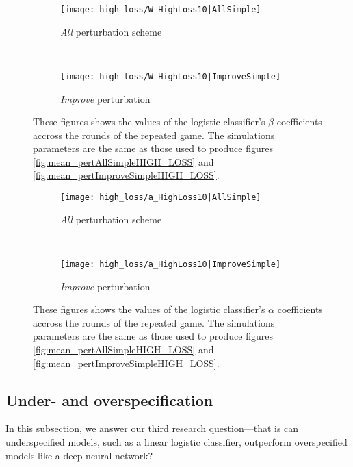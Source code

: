 \documentclass[12pt]{article} %
\begin{document}
\begin{figure*}[t!]
    \centering
    \begin{subfigure}{0.5\textwidth}
        \centering
        \texttt{[image: high\_loss/W\_HighLoss10|AllSimple]}
        \caption{\textit{All} perturbation scheme}
        \label{fig:high_loss_beta_ALL}
    \end{subfigure}%
    ~ 
    \begin{subfigure}{0.5\textwidth}
        \centering
        \texttt{[image: high\_loss/W\_HighLoss10|ImproveSimple]}
            \caption{\textit{Improve} perturbation}
        \label{fig:high_loss_beta_IMPROVE}
    \end{subfigure}
    \caption{These figures shows the values of the logistic classifier's $\beta$ coefficients accross the rounds of the repeated game. The simulations parameters are the same as those used to produce figures \ref{fig:mean_pertAllSimpleHIGH_LOSS} and \ref{fig:mean_pertImproveSimpleHIGH_LOSS}.}
\end{figure*}

\begin{figure*}[t!]
    \centering
    \begin{subfigure}{0.5\textwidth}
        \centering
        \texttt{[image: high\_loss/a\_HighLoss10|AllSimple]}
        \caption{\textit{All} perturbation scheme}
        \label{fig:high_loss_alpha_ALL}
    \end{subfigure}%
    ~ 
    \begin{subfigure}{0.5\textwidth}
        \centering
        \texttt{[image: high\_loss/a\_HighLoss10|ImproveSimple]}
            \caption{\textit{Improve} perturbation}
        \label{fig:high_loss_alpha_IMPROVE}
    \end{subfigure}
    \caption{These figures shows the values of the logistic classifier's $\alpha$ coefficients accross the rounds of the repeated game. The simulations parameters are the same as those used to produce figures \ref{fig:mean_pertAllSimpleHIGH_LOSS} and \ref{fig:mean_pertImproveSimpleHIGH_LOSS}.}
\end{figure*}




\subsection{Under- and overspecification}
\label{sec:over_under_specification}
In this subsection, we answer our third research question---that is can underspecified models, such as a linear logistic classifier, outperform overspecified models like a deep neural network? 
\end{document}
